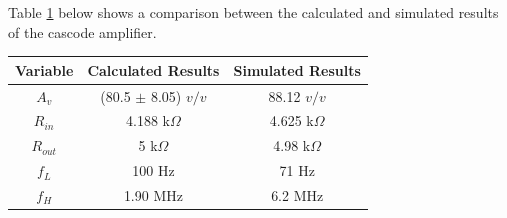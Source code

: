 \documentclass{article}
\begin{document}
	Table \ref{t:2} below shows a comparison between the calculated and simulated results of the cascode amplifier.
	\begin{table}[!ht]
		\centering
		\begin{tabular}{|c|c|c|}
			\hline
			\textbf{Variable} & \textbf{Calculated Results} & \textbf{Simulated Results}\\
			\hline\hline
			$A_v$ & (80.5 $\pm$ 8.05) $v/v$ & 88.12 $v/v$\\
			\hline
			$R_{in}$ & 4.188 k$\Omega$ & 4.625 k$\Omega$\\
			\hline
			$R_{out}$ & 5 k$\Omega$ & 4.98 k$\Omega$\\
			\hline
			$f_L$ & 100 Hz & 71 Hz\\
			\hline
			$f_H$ & 1.90 MHz & 6.2 MHz\\
			\hline
		\end{tabular}
		\label{t:2}
	\end{table}
\end{document}

